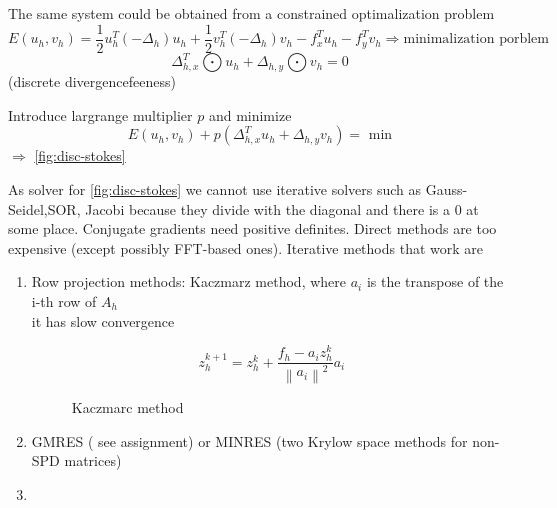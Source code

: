 The same system could be obtained from a constrained optimalization problem
\[ E(u_h, v_h) = \frac{1}{2}u_h^T(-\Delta_h)u_h + \frac{1}{2}v_h^T(-\Delta_h)v_h - f_x^T u_h - f_y^T v_h\Rightarrow \text{minimalization porblem}\]
\[ \Delta_{h,x}^T \bigodot u_h + \Delta_{h,y} \bigodot v_h = 0\] (discrete divergencefeeness)%

Introduce largrange multiplier $p$ and minimize
\[ E(u_h,v_h) + p(\Delta_{h,x}^T u_h + \Delta_{h,y} v_h) = \text{ min} \]
$\Rightarrow$ \ref{fig:disc-stokes}

As solver for \ref{fig:disc-stokes} we cannot use iterative solvers such as Gauss-Seidel,SOR, Jacobi because they divide with the diagonal and there is a $0$ at some place. Conjugate gradients need positive definites. Direct methods are too expensive (except possibly FFT-based ones). Iterative methods that work are
\begin{enumerate}
	\item Row projection methods: Kaczmarz method, where $a_i$ is the transpose of the i-th row of $A_h$ \\
	it has slow convergence %
\begin{figure}[H]
	\centering
	\[ z_h^{k+1} = z_h^k + \frac{f_h - a_i z_h^k}{\left\lVert a_i \right\rVert^2}a_i \]
	\renewcommand{\thefigure}{S16}
	\caption{Kaczmarc method}
	\label{fig:disc-freesplipb}
\end{figure}


	\item GMRES ( see assignment) or MINRES (two Krylow space methods for non-SPD matrices)
	
	\item %
\end{enumerate}
